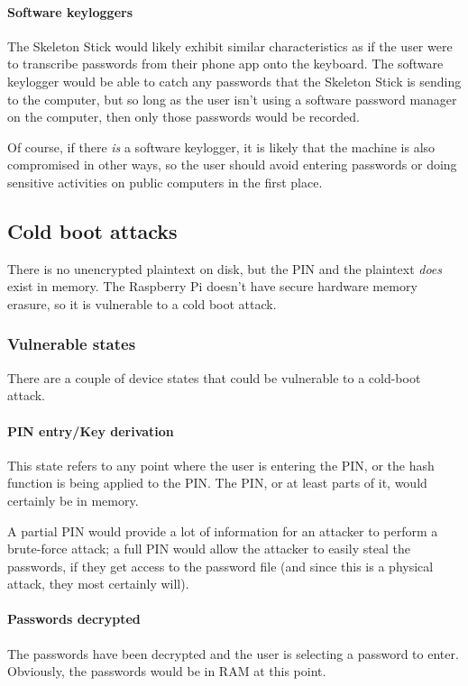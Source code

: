 \documentclass{article}
\begin{document}
\paragraph{Software keyloggers} The Skeleton Stick would likely exhibit similar characteristics as if the user were to transcribe passwords from their phone app onto the keyboard. The software keylogger would be able to catch any passwords that the Skeleton Stick is sending to the computer, but so long as the user isn't using a software password manager on the computer, then only those passwords would be recorded.

Of course, if there \textit{is} a software keylogger, it is likely that the machine is also compromised in other ways, so the user should avoid entering passwords or doing sensitive activities on public computers in the first place.

\subsection{Cold boot attacks}

There is no unencrypted plaintext on disk, but the PIN and the plaintext \textit{does} exist in memory. The Raspberry Pi doesn't have secure hardware memory erasure, so it is vulnerable to a cold boot attack.

\subsubsection{Vulnerable states}

There are a couple of device states that could be vulnerable to a cold-boot attack.

\paragraph{PIN entry/Key derivation} This state refers to any point where the user is entering the PIN, or the hash function is being applied to the PIN. The PIN, or at least parts of it, would certainly be in memory.

A partial PIN would provide a lot of information for an attacker to perform a brute-force attack; a full PIN would allow the attacker to easily steal the passwords, if they get access to the password file (and since this is a physical attack, they most certainly will).

\paragraph{Passwords decrypted} The passwords have been decrypted and the user is selecting a password to enter. Obviously, the passwords would be in RAM at this point.
\end{document}
